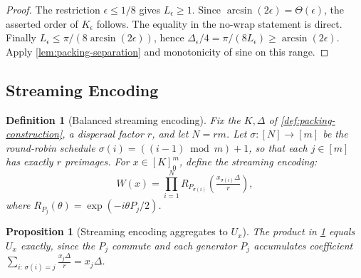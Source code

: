 \documentclass[aps,prx,reprint,floatfix,superscriptaddress]{revtex4-2}
\newtheorem{definition}{Definition}
\newtheorem{proposition}{Proposition}
\begin{document}
\begin{proof}
The restriction $\epsilon\leq1/8$ gives $L_\epsilon\geq1$.
Since $\arcsin(2\epsilon)=\Theta(\epsilon)$, the asserted order of
$K_\epsilon$ follows.  The equality in the no-wrap statement is direct.
Finally $L_\epsilon\leq\pi/(8\arcsin(2\epsilon))$, hence
$\Delta_\epsilon/4=\pi/(8L_\epsilon)\geq\arcsin(2\epsilon)$.
Apply \cref{lem:packing-separation} and monotonicity of sine on this range.
\end{proof}

\subsection{Streaming Encoding}

\begin{definition}[Balanced streaming encoding]
\label{def:streaming-encoding}
Fix the $K,\Delta$ of \cref{def:packing-construction}, a dispersal factor
$r$, and let $N = rm$. Let $\sigma : [N] \to [m]$ be
the round-robin schedule $\sigma(i) = ((i-1) \bmod m) + 1$, so that each
$j \in [m]$ has exactly $r$ preimages. For $x \in [K]_0^m$, define the
streaming encoding:
\begin{equation}\label{eq:streaming-W}
  W(x) = \prod_{i=1}^{N} R_{P_{\sigma(i)}}\!\left(\tfrac{x_{\sigma(i)} \Delta}{r}\right),
\end{equation}
where $R_{P_j}(\theta) = \exp(-i\theta P_j / 2)$.
\end{definition}

\begin{proposition}[Streaming encoding aggregates to $U_x$]
\label{prop:streaming-aggregates}
The product in \cref{def:streaming-encoding} equals $U_x$ exactly, since
the $P_j$ commute and each generator $P_j$ accumulates coefficient
$\sum_{i:\,\sigma(i)=j} \frac{x_j \Delta}{r} = x_j \Delta$.
\end{proposition}
\end{document}
